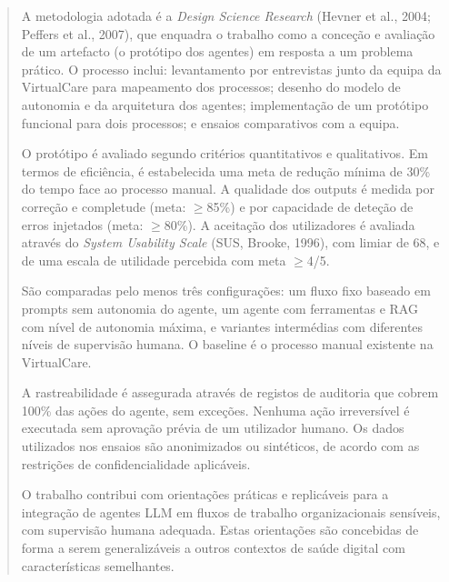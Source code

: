 \begin{abstract}
A metodologia adotada é a \textit{Design Science Research} (Hevner et al., 2004; Peffers et al., 2007), que enquadra o trabalho como a conceção e avaliação de um artefacto (o protótipo dos agentes) em resposta a um problema prático. O processo inclui: levantamento por entrevistas junto da equipa da VirtualCare para mapeamento dos processos; desenho do modelo de autonomia e da arquitetura dos agentes; implementação de um protótipo funcional para dois processos; e ensaios comparativos com a equipa.

O protótipo é avaliado segundo critérios quantitativos e qualitativos. Em termos de eficiência, é estabelecida uma meta de redução mínima de 30\% do tempo face ao processo manual. A qualidade dos outputs é medida por correção e completude (meta: $\geq$85\%) e por capacidade de deteção de erros injetados (meta: $\geq$80\%). A aceitação dos utilizadores é avaliada através do \textit{System Usability Scale} (SUS, Brooke, 1996), com limiar de 68, e de uma escala de utilidade percebida com meta $\geq$4/5.

São comparadas pelo menos três configurações: um fluxo fixo baseado em prompts sem autonomia do agente, um agente com ferramentas e RAG com nível de autonomia máxima, e variantes intermédias com diferentes níveis de supervisão humana. O baseline é o processo manual existente na VirtualCare.

A rastreabilidade é assegurada através de registos de auditoria que cobrem 100\% das ações do agente, sem exceções. Nenhuma ação irreversível é executada sem aprovação prévia de um utilizador humano. Os dados utilizados nos ensaios são anonimizados ou sintéticos, de acordo com as restrições de confidencialidade aplicáveis.

O trabalho contribui com orientações práticas e replicáveis para a integração de agentes LLM em fluxos de trabalho organizacionais sensíveis, com supervisão humana adequada. Estas orientações são concebidas de forma a serem generalizáveis a outros contextos de saúde digital com características semelhantes.


\end{abstract}

